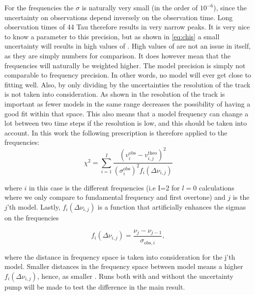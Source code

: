 For the frequencies the $\sigma$ is naturally very small (in the order of $10^{-6}$), since the uncertainty on observations depend inversely on the observation time. Long observation times of 44 Tau therefore results in very narrow peaks. It is very nice to know a parameter to this precision, but as shown in \eqref{eq:chis} a small uncertainty will results in high values of \chis. High values of \chis are not an issue in itself, as they are simply numbers for comparison. It does however mean that the frequencies will naturally be weighted higher. The model precision is simply not comparable to frequency precision. In other words, no model will ever get close to fitting well. Also, by only dividing by the uncertainties the resolution of the track is not taken into consideration. As shown in  the resolution of the track is important as fewer models in the same range decreases the possibility of having a good fit within that space. This also means that a model frequency can change a lot between two time steps if the resolution is low, and this should be taken into account. In this work the following prescription is therefore applied to the frequencies: 
\begin{equation}
\label{sigma}
    \chi^2  = \sum^I_{i=1}\frac{\left(v^{\text{obs}}_{i}-v^{\text{theo}}_{i,j}\right)^2}{(\sigma^{\text{obs}}_i)^2 f_i(\Delta\nu_{i,j})}
\end{equation}

\noindent where $i$ in this case is the different frequencies (i.e I=2 for $l=0$ calculations where we only compare to fundamental frequency and first overtone) and $j$ is the $j$'th model. Lastly, $f_i(\Delta \nu_{i,j})$ is a function that artificially enhances the sigmas on the frequencies

\begin{equation}
\label{function}
    f_i(\Delta \nu_{i,j}) = \frac{\nu_j - \nu_{j-1}}{\sigma_{\text{obs},i}},
\end{equation}
 
\noindent where the distance in frequency space is taken into consideration for the j'th model. Smaller distances in the frequency space between model means a higher $f_i(\Delta \nu_{i,j})$, hence, as smaller \chis. Runs both with and without the uncertainty pump will be made to test the difference in the main result. 


